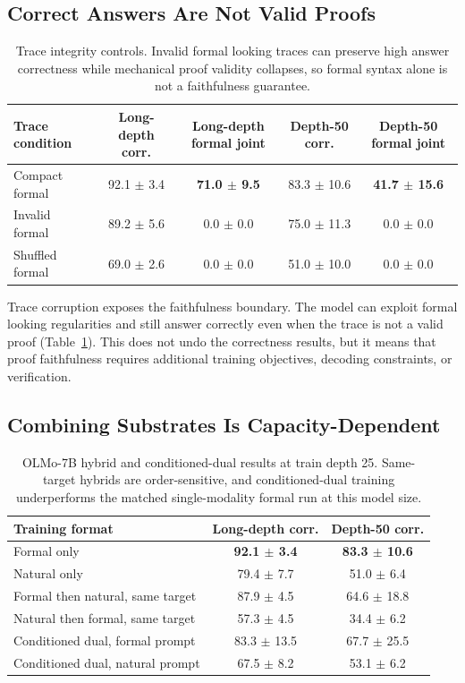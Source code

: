 \documentclass[11pt]{article}
\begin{document}
\subsection{Correct Answers Are Not Valid Proofs}

\begin{table}[t]
\centering
\small
\begin{tabular}{lcccc}
\toprule
Trace condition & Long-depth corr. & Long-depth formal joint & Depth-50 corr. & Depth-50 formal joint \\
\midrule
Compact formal & 92.1 $\pm$ 3.4 & \textbf{71.0 $\pm$ 9.5} & 83.3 $\pm$ 10.6 & \textbf{41.7 $\pm$ 15.6} \\
Invalid formal & 89.2 $\pm$ 5.6 & 0.0 $\pm$ 0.0 & 75.0 $\pm$ 11.3 & 0.0 $\pm$ 0.0 \\
Shuffled formal & 69.0 $\pm$ 2.6 & 0.0 $\pm$ 0.0 & 51.0 $\pm$ 10.0 & 0.0 $\pm$ 0.0 \\
\bottomrule
\end{tabular}
\caption{Trace integrity controls. Invalid formal looking traces can preserve
high answer correctness while mechanical proof validity collapses, so formal
syntax alone is not a faithfulness guarantee.}
\label{tab:integrity}
\end{table}

Trace corruption exposes the faithfulness boundary. The model can exploit
formal looking regularities and still answer correctly even when the trace is
not a valid proof (Table~\ref{tab:integrity}). This does not undo the
correctness results, but it means that proof faithfulness requires additional
training objectives, decoding constraints, or verification.

\subsection{Combining Substrates Is Capacity-Dependent}

\begin{table}[t]
\centering
\small
\begin{tabular}{lcc}
\toprule
Training format & Long-depth corr. & Depth-50 corr. \\
\midrule
Formal only & \textbf{92.1 $\pm$ 3.4} & \textbf{83.3 $\pm$ 10.6} \\
Natural only & 79.4 $\pm$ 7.7 & 51.0 $\pm$ 6.4 \\
Formal then natural, same target & 87.9 $\pm$ 4.5 & 64.6 $\pm$ 18.8 \\
Natural then formal, same target & 57.3 $\pm$ 4.5 & 34.4 $\pm$ 6.2 \\
Conditioned dual, formal prompt & 83.3 $\pm$ 13.5 & 67.7 $\pm$ 25.5 \\
Conditioned dual, natural prompt & 67.5 $\pm$ 8.2 & 53.1 $\pm$ 6.2 \\
\bottomrule
\end{tabular}
\caption{OLMo-7B hybrid and conditioned-dual results at train depth 25.
Same-target hybrids are order-sensitive, and conditioned-dual training
underperforms the matched single-modality formal run at this model size.}
\label{tab:hybrid}
\end{table}
\end{document}
